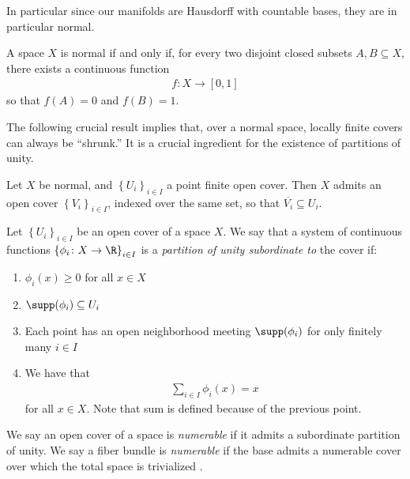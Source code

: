 \documentclass[11pt]{amsart}
\begin{document}
In particular since our manifolds are Hausdorff with countable bases, they are in particular normal.

\begin{lemma}
\label{lem:urysohn} 
A space $X$ is normal if and only if, for every two disjoint closed subsets $A,B \subseteq X$, there exists a continuous function
\begin{align*}
    f \colon X \to [0,1]
\end{align*}
so that $f(A) =0$ and $f(B) =1$.
\end{lemma}

The following crucial result implies that, over a normal space, locally finite covers can always be ``shrunk.'' It is a crucial ingredient for the existence of partitions of unity.

\begin{theorem}
\label{thm:shrinking}
Let $X$ be normal, and $\left\{ U_i \right\}_{i\in I}$ a point finite open cover. Then $X$ admits an open cover $\left\{ V_i \right\}_{i\in I}$, indexed over the same set, so that $\overline{V_i} \subseteq U_i$.
\end{theorem}

\begin{definition}\label{def:partition-of-unity} 
Let $\left\{ U_i \right\}_{i\in I}$ be an open cover of a space $X$. We say that a system of continuous functions $\left\{ \phi_i \colon X \to \R \right\}_{i\in I}$ is a \emph{partition of unity subordinate to} the cover if:
\begin{enumerate}
    \item $\phi_i(x) \ge 0$ for all $x\in X$
    \item $\supp(\phi_i) \subseteq U_i$
    \item Each point has an open neighborhood meeting $\supp(\phi_i)$ for only finitely many $i\in I$
    \item We have that
    \begin{align*}
        \sum_{i\in I}\phi_i(x) = x
    \end{align*}
    for all $x\in X$. Note that sum is defined because of the previous point.
\end{enumerate}
\end{definition}

\begin{definition}\label{def:numerable-open-cover}
We say an open cover of a space is \emph{numerable} if it admits a subordinate partition of unity. We say a fiber bundle is \emph{numerable} if the base admits a numerable cover over which the total space is trivialized \cite[7.1]{doldPartitionsUnityTheory1963}.
\end{definition}
\end{document}
